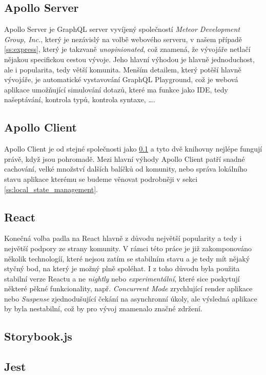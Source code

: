 \subsection{Apollo Server}
\label{ss:apollo_server}
Apollo Server je GraphQL server vyvíjený společností \emph{Meteor Development Group, Inc.}, který je nezávislý na volbě webového serveru, v našem případě \ref{ss:express}, který je takzvaně \emph{unopinionated}, což znamená, že vývojáře netlačí nějakou specifickou cestou vývoje. Jeho hlavní výhodou je hlavně jednoduchost, ale i popularita, tedy větší komunita. Menším detailem, který potěší hlavně vývojáře, je automatické vystavování GraphQL Playground, což je webová aplikace umožňující simulování dotazů, které ma funkce jako IDE, tedy našeptávání, kontrola typů, kontrola syntaxe, \ldots{}.

\subsection{Apollo Client}
\label{ss:apollo_client}
Apollo Client je od stejné společnosti jako \ref{ss:apollo_server} a tyto dvě knihovny nejlépe fungují právě, když jsou pohromadě. Mezi hlavní výhody Apollo Client patří snadné cachování, velké množství dalších balíčků od komunity, nebo správa lokálního stavu aplikace kterému se budeme věnovat podrobněji v sekci \ref{ss:local_state_management}.

\subsection{React}
\label{ss:react}
Konečná volba padla na React hlavně z důvodu největší popularity a tedy i největší podpory ze strany komunity. V rámci této práce je již zakomponováno několik technologíí, které nejsou zatím se stabilním stavu a je tedy mít nějaký styčný bod, na který je možný plně spoléhat. I z toho důvodu byla použita stabilní verze Reactu a ne \emph{nightly} nebo \emph{experimentální}, které sice poskytují některé pěkné funkcionality, např. \emph{Concurrent Mode} zrychlující render aplikace nebo \emph{Suspense} zjednodušující čekání na asynchronní úkoly, ale výsledná aplikace by byla nestabilní, což by pro vývoj znamenalo značné zdržení.


\subsection{Storybook.js}
\label{ss:storybook}

\subsection{Jest}
\label{ss:jest}
